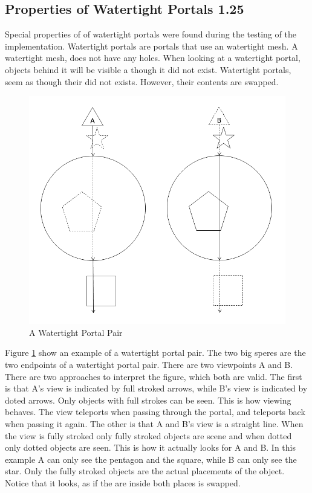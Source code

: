 \subsection{Properties of Watertight Portals 1.25}
\label{section:watertight}
Special properties of of watertight portals were found during the testing of the implementation. Watertight portals are portals that use an watertight mesh. A watertight mesh, does not have any holes. When looking at a watertight portal, objects behind it will be visible a though it did not exist. Watertight portals, seem as though their did not exists. However, their contents are swapped.

\begin{figure}[h]
	\centering
	\includegraphics[width=0.8\linewidth]{images/watertight.png}
	\caption{A Watertight Portal Pair}
	\label{fig:watertightportals}
\end{figure}

Figure \ref{fig:watertightportals} show an example of a watertight portal pair. The two big speres are the two endpoints of a watertight portal pair. There are two viewpoints A and B.
There are two approaches to interpret the figure, which both are valid.
The first is that A's view is indicated by full stroked arrows, while B's view is indicated by doted arrows.  Only objects with full strokes can be seen. This is how viewing behaves. The view teleports when passing through the portal, and teleports back when passing it again.
The other is that A and B's view is a straight line. When the view is fully stroked only fully stroked objects are scene and when dotted only dotted objects are seen. This is how it actually looks for A and B.
In this example A can only see the pentagon and the square, while B can only see the star. Only the fully stroked objects are the actual placements of the object. Notice that it looks, as if the are inside both places is swapped.

